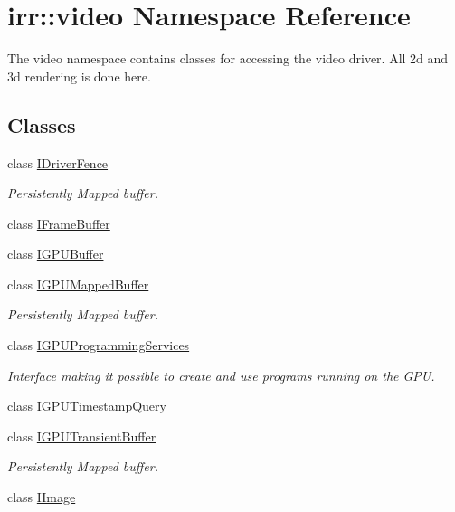 \hypertarget{namespaceirr_1_1video}{}\section{irr\+:\+:video Namespace Reference}
\label{namespaceirr_1_1video}


The video namespace contains classes for accessing the video driver. All 2d and 3d rendering is done here.  


\subsection*{Classes}
\begin{DoxyCompactItemize}
\item 
class \hyperlink{classirr_1_1video_1_1IDriverFence}{I\+Driver\+Fence}
\begin{DoxyCompactList}\small\item\em Persistently Mapped buffer. \end{DoxyCompactList}\item 
class \hyperlink{classirr_1_1video_1_1IFrameBuffer}{I\+Frame\+Buffer}
\item 
class \hyperlink{classirr_1_1video_1_1IGPUBuffer}{I\+G\+P\+U\+Buffer}
\item 
class \hyperlink{classirr_1_1video_1_1IGPUMappedBuffer}{I\+G\+P\+U\+Mapped\+Buffer}
\begin{DoxyCompactList}\small\item\em Persistently Mapped buffer. \end{DoxyCompactList}\item 
class \hyperlink{classirr_1_1video_1_1IGPUProgrammingServices}{I\+G\+P\+U\+Programming\+Services}
\begin{DoxyCompactList}\small\item\em Interface making it possible to create and use programs running on the G\+PU. \end{DoxyCompactList}\item 
class \hyperlink{classirr_1_1video_1_1IGPUTimestampQuery}{I\+G\+P\+U\+Timestamp\+Query}
\item 
class \hyperlink{classirr_1_1video_1_1IGPUTransientBuffer}{I\+G\+P\+U\+Transient\+Buffer}
\begin{DoxyCompactList}\small\item\em Persistently Mapped buffer. \end{DoxyCompactList}\item 
class \hyperlink{classirr_1_1video_1_1IImage}{I\+Image}

\end{DoxyCompactItemize}
